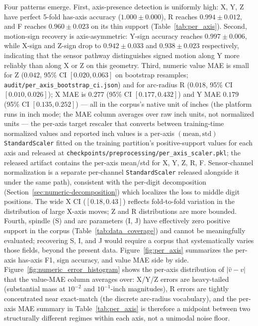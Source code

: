 \documentclass[sensors,article,submit,moreauthors,pdftex]{Definitions/mdpi}
\begin{document}
Four patterns emerge. First, axis-presence detection is uniformly high: X, Y, Z have perfect 5-fold has-axis accuracy ($1.000 \pm 0.000$), R reaches $0.994 \pm 0.012$, and F reaches $0.960 \pm 0.023$ on its thin support (Table~\ref{tab:per_axis}). Second, motion-sign recovery is axis-asymmetric: Y-sign accuracy reaches $0.997 \pm 0.006$, while X-sign and Z-sign drop to $0.942 \pm 0.033$ and $0.938 \pm 0.023$ respectively, indicating that the sensor pathway distinguishes signed motion along Y more reliably than along X or Z on this geometry. Third, numeric value MAE is small for Z ($0.042$, 95\% CI $[0.020, 0.063]$ on bootstrap resamples; \texttt{audit/per\_axis\_bootstrap\_ci.json}) and for arc-radius R ($0.018$, 95\% CI $[0.010, 0.026]$); X MAE is $0.277$ (95\% CI $[0.177, 0.432]$) and Y MAE $0.179$ (95\% CI $[0.135, 0.252]$) --- all in the corpus's native unit of inches (the platform runs in inch mode; the MAE column averages over raw inch units, not normalized units --- the per-axis target rescaler that converts between training-time normalized values and reported inch values is a per-axis $(\text{mean}, \text{std})$ \texttt{StandardScaler} fitted on the training partition's positive-support values for each axis and released at \texttt{checkpoints/preprocessing/per\_axis\_scaler.pkl}; the released artifact contains the per-axis mean/std for X, Y, Z, R, F. Sensor-channel normalization is a separate per-channel \texttt{StandardScaler} released alongside it under the same path), consistent with the per-digit decomposition (Section~\ref{sec:numeric-decomposition}) which localizes the loss to middle digit positions. The wide X CI ($[0.18, 0.43]$) reflects fold-to-fold variation in the distribution of large X-axis moves; Z and R distributions are more bounded. Fourth, spindle (S) and arc parameters (I, J) have effectively zero positive support in the corpus (Table~\ref{tab:data_coverage}) and cannot be meaningfully evaluated; recovering S, I, and J would require a corpus that systematically varies those fields, beyond the present data. Figure~\ref{fig:per_axis} summarizes the per-axis has-axis F1, sign accuracy, and value MAE side by side. Figure~\ref{fig:numeric_error_histogram} shows the per-axis distribution of $|\hat{v}-v|$ that the value-MAE column averages over: X/Y/Z errors are heavy-tailed (substantial mass at $10^{-2}$ and $10^{-1}$-inch magnitudes), R errors are tightly concentrated near exact-match (the discrete arc-radius vocabulary), and the per-axis MAE summary in Table~\ref{tab:per_axis} is therefore a midpoint between two structurally different regimes within each axis, not a unimodal noise floor.
\end{document}
